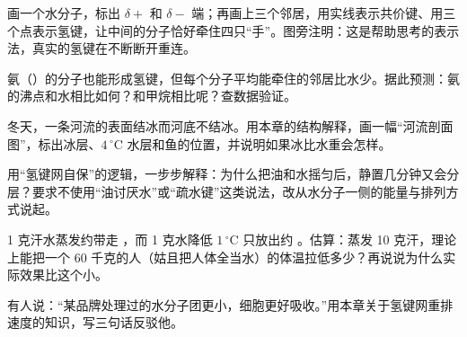 \begin{sikaoti}
\item 画一个水分子，标出 $\delta+$ 和 $\delta-$ 端；再画上三个邻居，用实线表示共价键、用三个点表示氢键，让中间的分子恰好牵住四只“手”。图旁注明：这是帮助思考的表示法，真实的氢键在不断断开重连。
\item 氨（）的分子也能形成氢键，但每个分子平均能牵住的邻居比水少。据此预测：氨的沸点和水相比如何？和甲烷相比呢？查数据验证。
\item 冬天，一条河流的表面结冰而河底不结冰。用本章的结构解释，画一幅“河流剖面图”，标出冰层、$4\,^{\circ}\mathrm{C}$ 水层和鱼的位置，并说明如果冰比水重会怎样。
\item 用“氢键网自保”的逻辑，一步步解释：为什么把油和水摇匀后，静置几分钟又会分层？要求不使用“油讨厌水”或“疏水键”这类说法，改从水分子一侧的能量与排列方式说起。
\item 1 克汗水蒸发约带走 ，而 1 克水降低 $1\,^{\circ}\mathrm{C}$ 只放出约 。估算：蒸发 10 克汗，理论上能把一个 60 千克的人（姑且把人体全当水）的体温拉低多少？再说说为什么实际效果比这个小。
\item 有人说：“某品牌处理过的水分子团更小，细胞更好吸收。”用本章关于氢键网重排速度的知识，写三句话反驳他。
\end{sikaoti}
